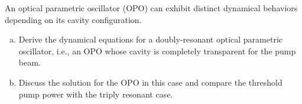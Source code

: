 %


\begin{exercicio}
An optical parametric oscillator (OPO) can exhibit distinct dynamical behaviors depending on its cavity configuration.

\begin{enumerate}[a)]
    \item Derive the dynamical equations for a doubly-resonant optical parametric oscillator, i.e., an OPO whose cavity is completely transparent for the pump beam.
    \item Discuss the solution for the OPO in this case and compare the threshold pump power with the triply resonant case.
\end{enumerate}

\end{exercicio}

